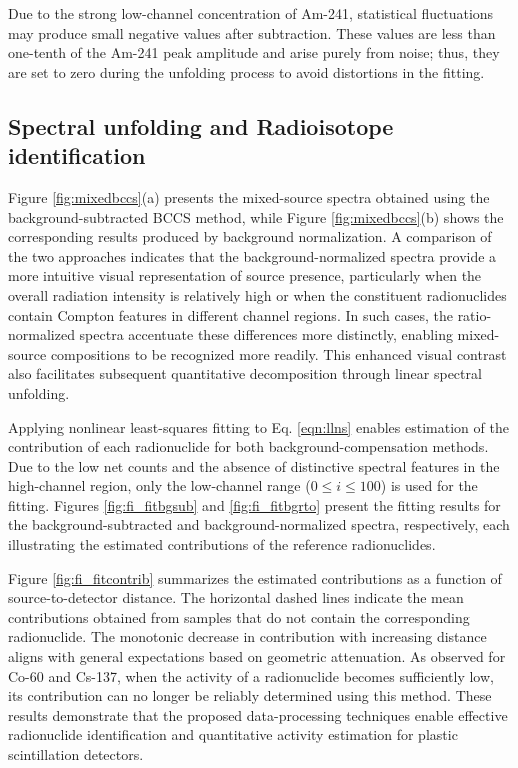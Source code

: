 \documentclass[10pt]{wlscirep}
\begin{document}
Due to the strong low-channel concentration of Am-241, statistical fluctuations may produce small negative values after subtraction. These values are less than one-tenth of the Am-241 peak amplitude and arise purely from noise; thus, they are set to zero during the unfolding process to avoid distortions in the fitting.




\subsection*{Spectral unfolding and Radioisotope identification}

Figure \ref{fig:mixedbccs}(a) presents the mixed-source spectra obtained using the background-subtracted BCCS method, while Figure \ref{fig:mixedbccs}(b) shows the corresponding results produced by background normalization. A comparison of the two approaches indicates that the background-normalized spectra provide a more intuitive visual representation of source presence, particularly when the overall radiation intensity is relatively high or when the constituent radionuclides contain Compton features in different channel regions. In such cases, the ratio-normalized spectra accentuate these differences more distinctly, enabling mixed-source compositions to be recognized more readily. This enhanced visual contrast also facilitates subsequent quantitative decomposition through linear spectral unfolding.

Applying nonlinear least-squares fitting to Eq. \ref{eqn:llns} enables estimation of the contribution of each radionuclide for both background-compensation methods. Due to the low net counts and the absence of distinctive spectral features in the high-channel region, only the low-channel range ($0 \le i \le 100$) is used for the fitting. Figures \ref{fig:fi_fitbgsub} and \ref{fig:fi_fitbgrto} present the fitting results for the background-subtracted and background-normalized spectra, respectively, each illustrating the estimated contributions of the reference radionuclides.

Figure \ref{fig:fi_fitcontrib} summarizes the estimated contributions as a function of source-to-detector distance. The horizontal dashed lines indicate the mean contributions obtained from samples that do not contain the corresponding radionuclide. The monotonic decrease in contribution with increasing distance aligns with general expectations based on geometric attenuation. As observed for Co-60 and Cs-137, when the activity of a radionuclide becomes sufficiently low, its contribution can no longer be reliably determined using this method. These results demonstrate that the proposed data-processing techniques enable effective radionuclide identification and quantitative activity estimation for plastic scintillation detectors.
\end{document}
